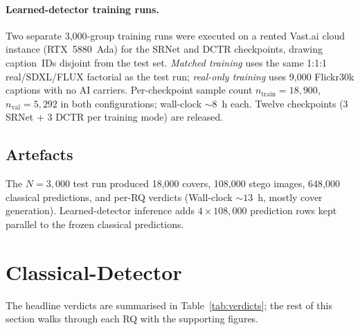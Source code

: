 \documentclass[10pt,twocolumn,a4paper]{article}
\DeclareRobustCommand{\by}[1]{\textnormal{\normalfont\footnotesize\space--- #1}}
\begin{document}
\paragraph{Learned-detector training runs.} Two separate 3{,}000-group training runs were executed on a rented Vast.ai cloud instance (RTX~5880~Ada) for the SRNet and DCTR checkpoints, drawing caption~IDs disjoint from the test set. \emph{Matched training} uses the same 1:1:1 real/SDXL/FLUX factorial as the test run; \emph{real-only training} uses 9{,}000 Flickr30k captions with no AI carriers. Per-checkpoint sample count $n_\text{train}\!=\!18{,}900$, $n_\text{val}\!=\!5{,}292$ in both configurations; wall-clock $\sim\!8$~h each. Twelve checkpoints (3 SRNet + 3 DCTR per training mode) are released.

\subsection{Artefacts}
The $N\!=\!3{,}000$ test run produced 18{,}000 covers, 108{,}000 stego images, 648{,}000 classical predictions, and per-RQ verdicts (Wall-clock $\sim\!13$~h, mostly cover generation). Learned-detector inference adds $4\times108{,}000$ prediction rows kept parallel to the frozen classical predictions.

\section[Classical-Detector\by{\textbf{Writer:} Jimena Narvaez  \textbf{Reviewer:} David \textbf{Contributor:}  Nikolas}]{Classical-Detector}

\label{sec:results-classical}
\label{sec:results}

The headline verdicts are summarised in Table~\ref{tab:verdicts}; the rest of this section walks through each RQ with the supporting figures.
\end{document}
